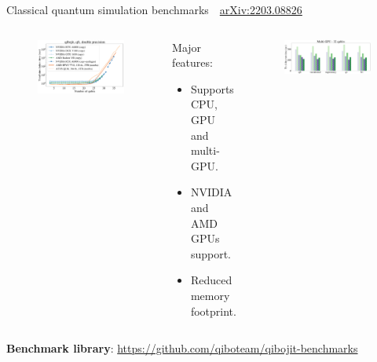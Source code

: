 \documentclass[aspectratio=169, 8pt, xcolor={svgnames}, hyperref={linkcolor=black}]{beamer}
\begin{document}
 \begin{frame}{Classical quantum simulation benchmarks \hfill \faBook\,\, \href{https://arxiv.org/abs/2203.08826}{arXiv:2203.08826}}

   \begin{columns}
     \column{7cm}

   \begin{figure}
     \includegraphics[width=\textwidth]{figures/devices_qft_total_simulation_time_double.pdf}
   \end{figure}

     \column{7cm}
     \begin{exampleblock}{Major features:}
       \begin{itemize}
         \item Supports CPU, GPU and multi-GPU.
         \item NVIDIA and AMD GPUs support.
         \item Reduced memory footprint.
       \end{itemize}
     \end{exampleblock}
     \begin{figure}
       \includegraphics[width=\textwidth]{figures/multigpu_32qubits_total_dry_time_double.pdf}
     \end{figure}
   \end{columns}

   {\small {\bf Benchmark library}: \url{https://github.com/qiboteam/qibojit-benchmarks} }

 \end{frame}
\end{document}
